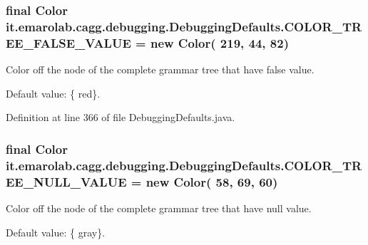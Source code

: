 \hypertarget{classit_1_1emarolab_1_1cagg_1_1debugging_1_1DebuggingDefaults_a49fd0ca699df5a691d7ff2bac6e3e14d}{
\subsubsection[{C\-O\-L\-O\-R\-\_\-\-T\-R\-E\-E\-\_\-\-F\-A\-L\-S\-E\-\_\-\-V\-A\-L\-U\-E}]{\setlength{\rightskip}{0pt plus 5cm}final Color it.\-emarolab.\-cagg.\-debugging.\-Debugging\-Defaults.\-C\-O\-L\-O\-R\-\_\-\-T\-R\-E\-E\-\_\-\-F\-A\-L\-S\-E\-\_\-\-V\-A\-L\-U\-E = new Color( 219, 44, 82)\hspace{0.3cm}{\ttfamily [static]}}}\label{classit_1_1emarolab_1_1cagg_1_1debugging_1_1DebuggingDefaults_a49fd0ca699df5a691d7ff2bac6e3e14d}
Color off the node of the complete grammar tree that have false value.\par
 Default value\-: \{ red\}. 

Definition at line 366 of file Debugging\-Defaults.\-java.

\hypertarget{classit_1_1emarolab_1_1cagg_1_1debugging_1_1DebuggingDefaults_ad364a2707633e14f2a4e92fe53495993}{
\subsubsection[{C\-O\-L\-O\-R\-\_\-\-T\-R\-E\-E\-\_\-\-N\-U\-L\-L\-\_\-\-V\-A\-L\-U\-E}]{\setlength{\rightskip}{0pt plus 5cm}final Color it.\-emarolab.\-cagg.\-debugging.\-Debugging\-Defaults.\-C\-O\-L\-O\-R\-\_\-\-T\-R\-E\-E\-\_\-\-N\-U\-L\-L\-\_\-\-V\-A\-L\-U\-E = new Color( 58, 69, 60)\hspace{0.3cm}{\ttfamily [static]}}}\label{classit_1_1emarolab_1_1cagg_1_1debugging_1_1DebuggingDefaults_ad364a2707633e14f2a4e92fe53495993}
Color off the node of the complete grammar tree that have null value.\par
 Default value\-: \{ gray\}. 

